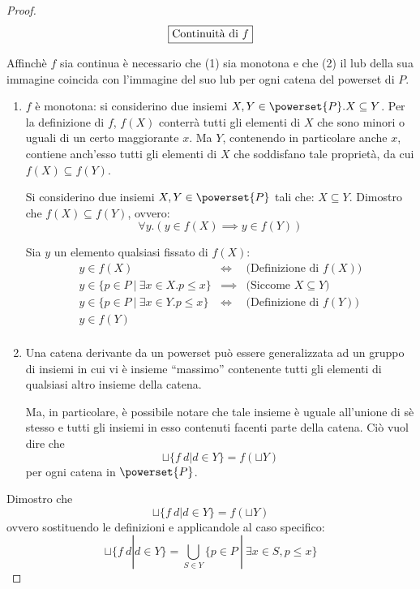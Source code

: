 \begin{proof}
$$
\boxed{\text{Continuità di } f}
$$

Affinchè $f$ sia continua è necessario che (1) sia monotona e che (2) il lub
della sua immagine coincida con l'immagine del suo lub per ogni catena del
powerset di $P$.

\begin{enumerate}
  \item $f$ è monotona: si considerino due insiemi
    $X,Y\in \powerset{P}. X \subseteq Y$. Per la definizione di $f$, $f(X)$ conterrà
    tutti gli elementi di $X$ che sono minori o uguali di un certo maggiorante
    $x$.
    Ma $Y$, contenendo in particolare anche $x$, contiene anch'esso tutti gli
    elementi di $X$ che soddisfano tale proprietà, da cui
    $f(X) \subseteq f(Y)$.

    Si considerino due insiemi $X, Y \in \powerset{P}$ tali che:
    $X \subseteq Y$. Dimostro che $f(X) \subseteq f(Y)$, ovvero:
    $$
    \forall y.(y \in f(X) \implies y \in f(Y))
    $$
    
    Sia $y$ un elemento qualsiasi fissato di $f(X)$:
    $$
    \begin{array}{llr}
     y \in f(X) & \iff & \text{(Definizione di $f(X))$}\\
     y \in \{p \in P\ |\ \exists x \in X. p \leq x \} & \implies & \text{(Siccome $X \subseteq Y$) } \\
     y \in \{p \in P\ |\ \exists x \in Y. p \leq x \} & \iff &
     \text{(Definizione di $f(Y)$)} \\
     y \in f(Y) & & \\
    \end{array}
    $$
    
    
  \item Una catena derivante da un powerset può essere generalizzata ad un
    gruppo di insiemi in cui  vi è insieme ``massimo'' contenente tutti gli
    elementi di qualsiasi altro insieme della catena.

	

    Ma, in particolare, è possibile notare che tale insieme è uguale all'unione
    di sè stesso e tutti gli insiemi in esso contenuti facenti parte della
    catena. Ciò vuol dire che
    $$
    \sqcup\{f\ d | d \in Y\} = f(\sqcup Y)
    $$
    per ogni catena in $\powerset{P}$.
\end{enumerate}

Dimostro che 
$$
\sqcup\{f\ d | d \in Y\} = f(\sqcup Y)
$$
ovvero sostituendo le definizioni e applicandole al caso specifico:
$$
\sqcup\{f\ d | d \in Y\} = \bigcup_{S \in Y} \{p \in P\ |\ \exists x \in S, p \leq x\}
$$


\end{proof}
